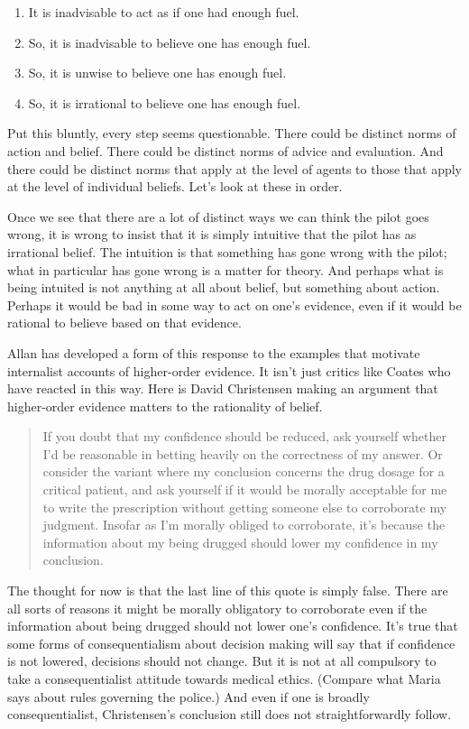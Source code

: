 \begin{enumerate}
\item{} It is inadvisable to act as if one had enough fuel.

\item{} So, it is inadvisable to believe one has enough fuel.

\item{} So, it is unwise to believe one has enough fuel.

\item{} So, it is irrational to believe one has enough fuel.

\end{enumerate}
Put this bluntly, every step seems questionable. There could be distinct norms of action and belief. There could be distinct norms of advice and evaluation. And there could be distinct norms that apply at the level of agents to those that apply at the level of individual beliefs. Let's look at these in order.

Once we see that there are a lot of distinct ways we can think the pilot goes wrong, it is wrong to insist that it is simply intuitive that the pilot has as irrational belief. The intuition is that something has gone wrong with the pilot; what in particular has gone wrong is a matter for theory. And perhaps what is being intuited is not anything at all about belief, but something about action. Perhaps it would be bad in some way to act on one's evidence, even if it would be rational to believe based on that evidence.

Allan \citet{Coates2012} has developed a form of this response to the examples that motivate internalist accounts of higher-order evidence. It isn't just critics like Coates who have reacted in this way. Here is David Christensen making an argument that higher-order evidence matters to the rationality of belief.

\begin{quote}
If you doubt that my confidence should be reduced, ask yourself whether I'd be reasonable in betting heavily on the correctness of my answer. Or consider the variant where my conclusion concerns the drug dosage for a critical patient, and ask yourself if it would be morally acceptable for me to write the prescription without getting someone else to corroborate my judgment. Insofar as I'm morally obliged to corroborate, it's because the information about my being drugged should lower my confidence in my conclusion. ~\citep[195]{Christensen2010a}
\end{quote}
The thought for now is that the last line of this quote is simply false. There are all sorts of reasons it might be morally obligatory to corroborate even if the information about being drugged should not lower one's confidence. It's true that some forms of consequentialism about decision making will say that if confidence is not lowered, decisions should not change. But it is not at all compulsory to take a consequentialist attitude towards medical ethics. (Compare what Maria \citet[430]{Lasonen-Aarnio2014a} says about rules governing the police.) And even if one is broadly consequentialist, Christensen's conclusion still does not straightforwardly follow.

